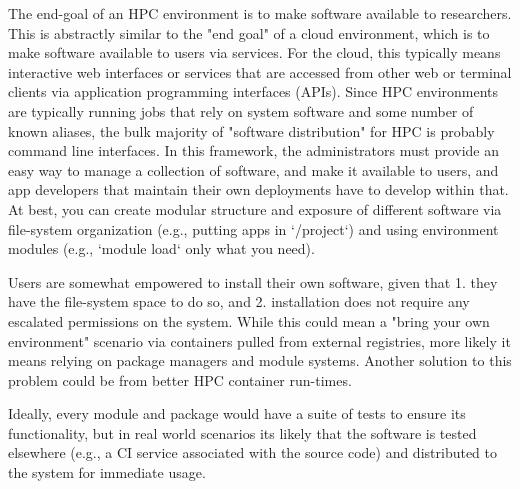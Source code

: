The end-goal of an HPC environment is to make software available to researchers. This is abstractly similar to the "end goal" of a cloud environment, which is to make software available to users via services. For the cloud, this typically means interactive web interfaces or services that are accessed from other web or terminal clients via application programming interfaces (APIs). Since HPC environments are typically running jobs that rely on system software and some number of known aliases, the bulk majority of "software distribution" for HPC is probably command line interfaces. In this framework, the administrators must provide an easy way to manage a collection of software, and make it available to users, and app developers that maintain their own deployments have to develop within that. At best, you can create modular structure and exposure of different software via file-system organization (e.g., putting apps in `/project`) and using environment modules \cite{LMOD,environment-modules,shpc} (e.g., `module load` only what you need).

Users are somewhat empowered to install their own software, given that 1. they have the file-system space to do so, and 2. installation does not require any escalated permissions on the system.
While this could mean a "bring your own environment" scenario via containers pulled from external registries, more likely it means relying on package managers and module systems.
Another solution to this problem could be from better HPC container run-times.

Ideally, every module and package would have a suite of tests to ensure its functionality, but in real world scenarios its likely that the software is tested elsewhere (e.g., a CI service associated with the source code) and distributed to the system for immediate usage.
